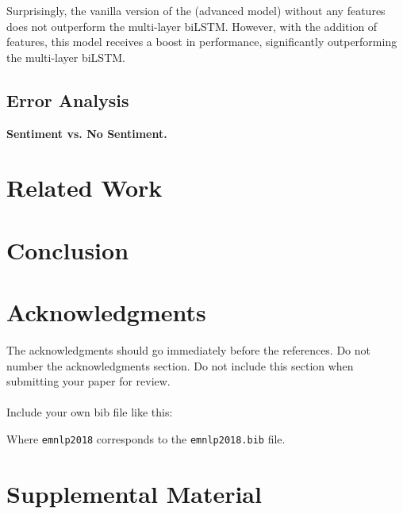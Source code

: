 \documentclass[11pt,a4paper]{article}
\begin{document}
Surprisingly, the vanilla version of the (advanced model) without any features does not outperform the multi-layer biLSTM.
However, with the addition of features, this model receives a boost in performance, significantly outperforming the multi-layer biLSTM.


\subsection{Error Analysis}
\noindent\textbf{Sentiment vs. No Sentiment.}

\section{Related Work}

\section{Conclusion}

\section*{Acknowledgments}
The acknowledgments should go immediately before the references.  Do
not number the acknowledgments section. Do not include this section
when submitting your paper for review. \\

 \\

Include your own bib file like this:
{\small\verb||
\verb||}

Where \verb|emnlp2018| corresponds to the {\tt emnlp2018.bib} file.



\appendix

\section{Supplemental Material}
\end{document}
